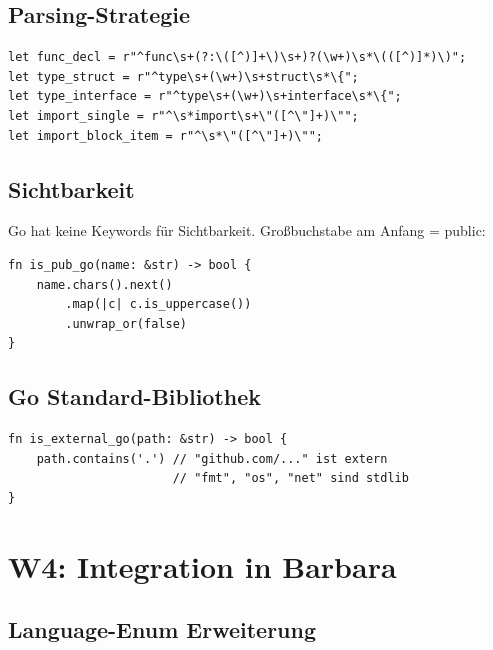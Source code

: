 \documentclass[11pt,a4paper]{article}
\begin{document}
\subsection{Parsing-Strategie}

\begin{lstlisting}[style=rust]
let func_decl = r"^func\s+(?:\([^)]+\)\s+)?(\w+)\s*\(([^)]*)\)";
let type_struct = r"^type\s+(\w+)\s+struct\s*\{";
let type_interface = r"^type\s+(\w+)\s+interface\s*\{";
let import_single = r"^\s*import\s+\"([^\"]+)\"";
let import_block_item = r"^\s*\"([^\"]+)\"";
\end{lstlisting}

\subsection{Sichtbarkeit}

Go hat keine Keywords f\"ur Sichtbarkeit. Gro{\ss}buchstabe 
am Anfang = public:

\begin{lstlisting}[style=rust]
fn is_pub_go(name: &str) -> bool {
    name.chars().next()
        .map(|c| c.is_uppercase())
        .unwrap_or(false)
}
\end{lstlisting}

\subsection{Go Standard-Bibliothek}

\begin{lstlisting}[style=rust]
fn is_external_go(path: &str) -> bool {
    path.contains('.') // "github.com/..." ist extern
                       // "fmt", "os", "net" sind stdlib
}
\end{lstlisting}


\section{W4: Integration in Barbara}
\label{sec:integration}

\subsection{Language-Enum Erweiterung}
\end{document}
